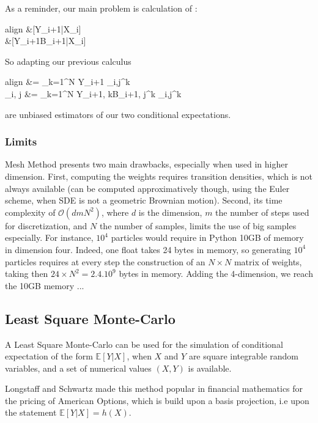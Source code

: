\documentclass[english,11pt,openany]{article}
\theoremstyle{definition}
\newcommand{\bigO}{\mathcal{O}}
\theoremstyle{plain}
\theoremstyle{definition}
\begin{document}
	
	As a reminder, our main problem is calculation of : 
	
	
	\begin{empheq}[left = \empheqlbrace]{align}
	&[Y_{i+1}|X_i]\\
	&[Y_{i+1}\Delta B_{i+1}|X_i]
	\end{empheq}
	
	So adapting our previous calculus
	
	\begin{empheq}[left = \empheqlbrace]{align}
	 &=  \sum_{k=1}^{N} Y_{i+1} \omega_{i,j}^k\\
	_{i, j} &=  \sum_{k=1}^{N} Y_{i+1, k}\Delta B_{i+1, j}^k \omega_{i,j}^k
	\end{empheq}
	
	are unbiased estimators of our two conditional expectations. 
	
	\subsubsection{Limits}
	
	
	Mesh Method presents two main drawbacks, especially when used in higher dimension. 
	First, computing the weights requires transition densities, which is not always available (can be computed approximatively though, using the Euler scheme, when SDE is not a geometric Brownian motion). 
	Second, its time complexity of $\bigO(dmN^2)$, where $d$ is the dimension, $m$ the number of steps used for discretization, and $N$ the number of samples, limits the use of big samples especially. 
	For instance, $10^4$ particles would require in Python 10GB of memory in dimension four. Indeed, one float takes 24 bytes in memory, so generating $10^4$ particles requires at every step the construction of an $N\times N$ matrix of weights, taking then $24\times N^2 = 2.4.10^9$ bytes in memory. Adding the 4-dimension, we reach the 10GB memory ... 
	
	\subsection{Least Square Monte-Carlo}
	
	A Least Square Monte-Carlo can be used for the simulation of conditional expectation of the form $\mathbb{E}[Y|X]$, when $X$ and $Y$ are square integrable random variables, and a set of numerical values $(X,Y)$ is available. 
	
	Longstaff and Schwartz made this method popular in financial mathematics for the pricing of American Options, which is build upon a basis projection, i.e upon the statement $\mathbb{E}[Y|X] = h(X)$. 
	
\end{document}
